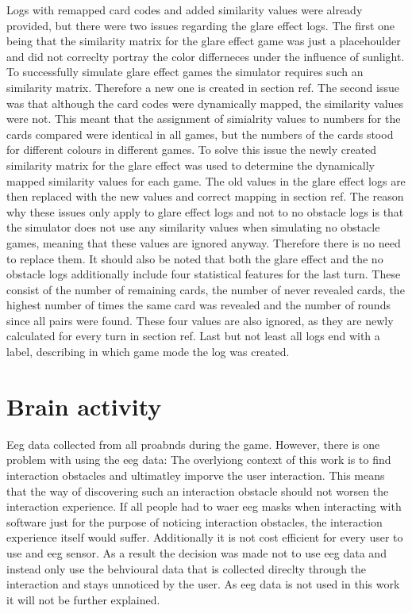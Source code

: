 Logs with remapped card codes and added similarity values were already provided, but there were two issues regarding the glare effect logs. The first one being that the similarity matrix for the glare effect game was just a placehoulder and did not correclty portray the color differneces under the influence of sunlight. To successfully simulate glare effect games the simulator requires such an similarity matrix. Therefore a new one is created in section ref. The second issue was that although the card codes were dynamically mapped, the similarity values were not. This meant that the assignment of simialrity values to numbers for the cards compared were identical in all games, but the numbers of the cards stood for different colours in different games. To solve this issue the newly created similarity matrix for the glare effect was used to determine the dynamically mapped similarity values for each game. The old values in the glare effect logs are then replaced with the new values and correct mapping in section ref. The reason why these issues only apply to glare effect logs and not to no obstacle logs is that the simulator does not use any similarity values when simulating no obstacle games, meaning that these values are ignored anyway. Therefore there is no need to replace them. It should also be noted that both the glare effect and the no obstacle logs additionally include four statistical features for the last turn. These consist of the number of remaining cards, the number of never revealed cards, the highest number of times the same card was revealed and the number of rounds since all pairs were found. These four values are also ignored, as they are newly calculated for every turn in section ref. Last but not least all logs end with a label, describing in which game mode the log was created. 

\section{Brain activity}
Eeg data collected from all proabnds during the game. However, there is one problem with using the eeg data: The overlyiong context of this work is to find interaction obstacles and ultimatley imporve the user interaction. This means that the way of discovering such an interaction obstacle should not worsen the interaction experience. If all people had to waer eeg masks when interacting with software just for the purpose of noticing interaction obstacles, the interaction experience itself would suffer. Additionally it is not cost efficient for every user to use and eeg sensor. As a result the decision was made not to use eeg data and instead only use the behvioural data that is collected direclty through the interaction and stays unnoticed by the user. As eeg data is not used in this work it will not be further explained. 




